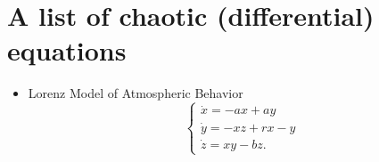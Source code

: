 \documentclass[11pt]{book}
\begin{document}
\begin{itemize}
\end{itemize}

\section{A list of chaotic (differential) equations}
\begin{itemize}
  \item Lorenz Model of Atmospheric Behavior
    \begin{equation*}
     \begin{cases}
      \dot{x} = -ax + ay \\
      \dot{y} = -xz + rx -y \\
      \dot{z} = xy - bz.
    \end{cases}
    \end{equation*}
    \end{itemize}
\end{document}
